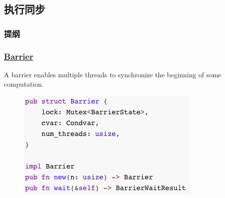 \subsection{执行同步} %
\begin{frame}
\frametitle{提纲} %
\tableofcontents %
\end{frame}
\begin{frame}[fragile]
    \frametitle{\href{https://doc.rust-lang.org/std/sync/struct.Barrier.html}{Barrier}}

A barrier enables multiple threads to synchronize the beginning of some computation. \pause

    \begin{figure}
    \includegraphics[width=0.6\linewidth]{figs/struct-barrier.png}
    \end{figure}

\end{frame}
% 
% 
% 
% 
